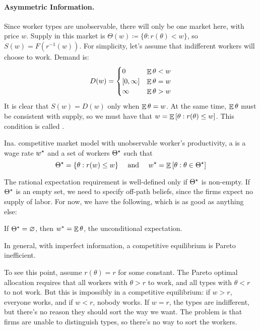 \documentclass[12pt]{article}
\begin{document}
\paragraph{Asymmetric Information.} Since worker types are unobservable, there will only be one market here, with price $w$. Supply in this market is $\Theta(w)\coloneqq \{\theta : r(\theta) < w\}$, so $S(w) = F(r^{-1}(w))$. For simplicity, let's assume that indifferent workers will choose to work. Demand is:
\[
D(w) = \begin{cases} 0 & \mathop{\mathbb{E}} \theta < w \\ [0,\infty] & \mathop{\mathbb{E}} \theta = w \\ \infty & \mathop{\mathbb{E}} \theta > w \end{cases}
\]
It is clear that $S(w) = D(w)$ only when $\mathop{\mathbb{E}} \theta = w$. At the same time, $\mathop{\mathbb{E}}\theta$ must be consistent with supply, so we must have that $w = \mathop{\mathbb{E}}\left[\theta : r(\theta) \le w\right]$. This condition is called .

\begin{definition}
	Ina. competitive market model with unobservable worker's productivity, a  is a wage rate $w^\star$ and a set of workers $\Theta^\star$ such that
	\[
	\Theta^\star = \{\theta : r(w) \le w\} \quad \text{ and } \quad w^\star = \mathop{\mathbb{E}}\left[ \theta : \theta \in \Theta^\star\right] 
	\]
\end{definition}

\begin{remark}
	The rational expectation requirement is well-defined only if $\Theta^\star$ is non-empty. If $\Theta^\star$ is an empty set, we need to specify off-path beliefs, since the firms expect no supply of labor. For now, we have the following, which is as good as anything else:
\end{remark}
\begin{assumption}
	If $\Theta^\star = \mathop{\varnothing}$, then $w^\star = \mathop{\mathbb{E}} \theta$, the unconditional expectation.
\end{assumption}

\begin{remark}
	In general, with imperfect information, a competitive equilibrium is Pareto inefficient. 
\end{remark}

\begin{example}
	To see this point, assume $r(\theta) = r$ for some constant. The Pareto optimal allocation requires that all workers with $\theta > r$ to work, and all types with $\theta < r$ to not work. But this is impossibly in a competitive equilibrium: if $w > r$, everyone works, and if $w < r$, nobody works. If $w = r$, the types are indifferent, but there's no reason they should sort the way we want. The problem is that firms are unable to distinguish types, so there's no way to sort the workers.
\end{example}
\end{document}
